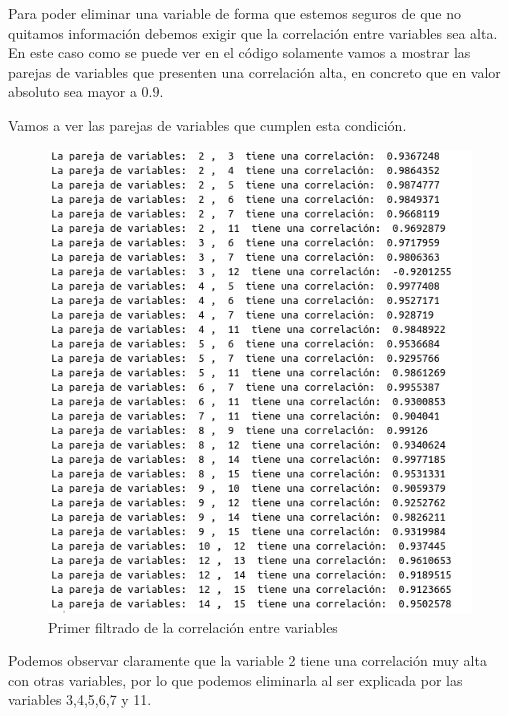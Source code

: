 \documentclass[12pt,a4paper]{article}
\begin{document}
Para poder eliminar una variable de forma que estemos seguros de que no quitamos información debemos exigir que la correlación entre variables sea alta. En este caso como se puede ver en el código solamente vamos a mostrar las parejas de variables que presenten una correlación alta, en concreto que en valor absoluto sea mayor a $0.9$.

Vamos a ver las parejas de variables que cumplen esta condición.

\begin{figure}[H]
	\centering
	\includegraphics[scale=0.6]{./Imagenes/correlacion_entre_variables1.png}
	\caption{Primer filtrado de la correlación entre variables}
\end{figure}

Podemos observar claramente que la variable 2 tiene una correlación muy alta con otras variables, por lo que podemos eliminarla al ser explicada por las variables 3,4,5,6,7 y 11.
\end{document}
